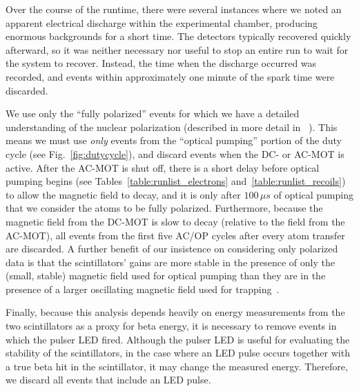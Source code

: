 Over the course of the runtime, there were several instances where we noted an apparent electrical discharge within the experimental chamber, producing enormous backgrounds for a short time.  The detectors typically recovered quickly afterward, so it was neither necessary nor useful to stop an entire run to wait for the system to recover.  Instead, the time when the discharge occurred was recorded, and events within approximately one minute of the spark time were discarded.  

We use only the ``fully polarized'' events for which we have a detailed understanding of the nuclear polarization (described in more detail in ~\cite{ben_OP}).  This means we must use \emph{only} events from the ``optical pumping'' portion of the duty cycle (see Fig.~\ref{fig:dutycycle}), and discard events when the DC- or AC-MOT is active.  After the AC-MOT is shut off, there is a short delay before optical pumping begins (see Tables~\ref{table:runlist_electrons} and~\ref{table:runlist_recoils}) to allow the magnetic field to decay, and it is only after $100\,\mu s$ of optical pumping that we consider the atoms to be fully polarized.  Furthermore, because the magnetic field from the DC-MOT is slow to decay (relative to the field from the AC-MOT), all events from the first five AC/OP cycles after every atom transfer are discarded.  A further benefit of our insistence on considering only polarized data is that the scintillators' gains are more stable in the presence of only the (small, stable) magnetic field used for optical pumping than they are in the presence of a larger oscillating magnetic field used for trapping~\cite{ben_thesis}.

Finally, because this analysis depends heavily on energy measurements from the two scintillators as a proxy for beta energy, it is necessary to remove events in which the pulser LED fired.  Although the pulser LED is useful for evaluating the stability of the scintillators, in the case where an LED pulse occurs together with a true beta hit in the scintillator, it may change the measured energy.  Therefore, we discard all events that include an LED pulse.   
	



